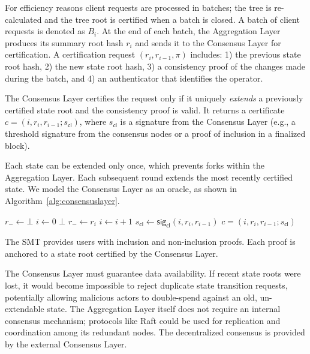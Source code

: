 \documentclass[twocolumn]{article}
\begin{document}
For efficiency reasons client requests are processed in batches; the tree is re-calculated and the tree root is certified when a batch is closed. A batch of client requests is denoted as $B_i$. At the end of each batch, the Aggregation Layer produces its summary root hash $r_i$ and sends it to the Consensus Layer for certification. A certification request $(r_i, r_{i-1}, \pi)$ includes: 1) the previous state root hash, 2) the new state root hash, 3) a consistency proof of the changes made during the batch, and 4) an authenticator that identifies the operator.

The Consensus Layer certifies the request only if it uniquely \textit{extends} a previously certified state root and the consistency proof is valid. It returns a certificate $c = (i, r_i, r_{i-1}; s_{\textsf{cl}})$, where $s_{\textsf{cl}}$ is a signature from the Consensus Layer (e.g., a threshold signature from the consensus nodes or a proof of inclusion in a finalized block).

Each state can be extended only once, which prevents forks within the Aggregation Layer. Each subsequent round extends the most recently certified state.
We model the Consensus Layer as an oracle, as shown in Algorithm~\ref{alg:consensuslayer}.

\begin{algorithm}[tbh]
  \caption{Consensus Layer modeled as an oracle}\label{alg:consensuslayer}
  \begin{algorithmic}[0]
        \State $r_- \gets \bot$
        \State $i \gets 0$
    \EndFunction
            \State \Return $\bot$
        \EndIf
        \State $r_- \gets r_i$
        \State $i \gets i+1$
        \State $s_{\textsf{cl}} \gets \textsf{sig}_\textsf{cl}(i, r_i, r_{i-1})$
        \State \Return $c = (i, r_i, r_{i-1}; s_{\textsf{cl}})$
    \EndFunction
  \end{algorithmic}
\end{algorithm}


The SMT provides users with inclusion and non-inclusion proofs. Each proof is anchored to a state root certified by the Consensus Layer.

The Consensus Layer must guarantee data availability. If recent state roots were lost, it would become impossible to reject duplicate state transition requests, potentially allowing malicious actors to double-spend against an old, un-extendable state. The Aggregation Layer itself does not require an internal consensus mechanism; protocols like Raft could be used for replication and coordination among its redundant nodes. The decentralized consensus is provided by the external Consensus Layer.
\end{document}

